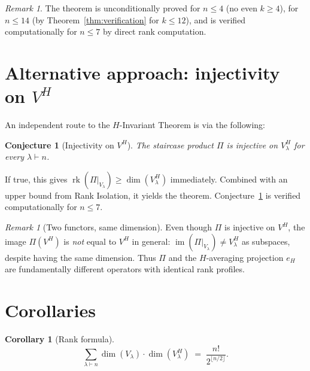\documentclass[12pt]{article}
\newtheorem{corollary}[theorem]{Corollary}
\newtheorem{conjecture}[theorem]{Conjecture}
\theoremstyle{definition}
\theoremstyle{remark}
\newtheorem{remark}[theorem]{Remark}
\begin{document}
\begin{remark}
The theorem is unconditionally proved for $n \le 4$ (no even $k \ge 4$),
for $n \le 14$ (by Theorem~\ref{thm:verification} for $k \le 12$), and is verified
computationally for $n \le 7$ by direct rank computation.
\end{remark}

\section{Alternative approach: injectivity on $V^H$}

An independent route to the $H$-Invariant Theorem is via the following:

\begin{conjecture}[Injectivity on $V^H$]
\label{conj:injective}
The staircase product $\Pi$ is injective on $V_\lambda^H$ for every $\lambda \vdash n$.
\end{conjecture}

If true, this gives $\operatorname{rk}(\Pi|_{V_\lambda}) \ge \dim(V_\lambda^H)$
immediately.  Combined with an upper bound from Rank Isolation, it yields the theorem.
Conjecture~\ref{conj:injective} is verified computationally for $n \le 7$.

\begin{remark}[Two functors, same dimension]
\label{rem:two-functors}
Even though $\Pi$ is injective on $V^H$, the image $\Pi(V^H)$ is \emph{not} equal
to $V^H$ in general: $\operatorname{im}(\Pi|_{V_\lambda}) \neq V_\lambda^H$ as
subspaces, despite having the same dimension.  Thus $\Pi$ and the $H$-averaging
projection $e_H$ are fundamentally different operators with identical rank profiles.
\end{remark}

\section{Corollaries}

\begin{corollary}[Rank formula]
\[
  \sum_{\lambda \vdash n} \dim(V_\lambda) \cdot \dim(V_\lambda^H)
  \;=\; \frac{n!}{2^{\lfloor n/2 \rfloor}}.
\]
\end{corollary}
\end{document}
